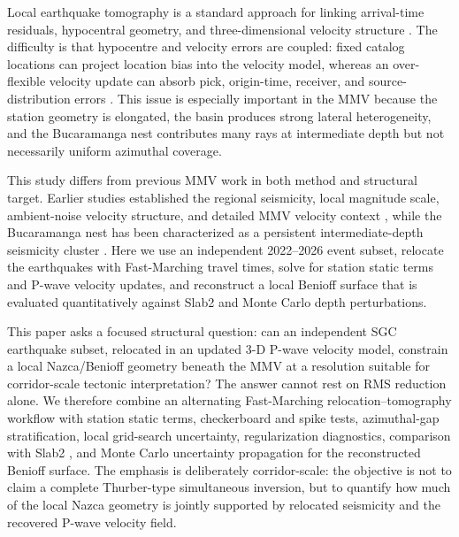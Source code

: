 \documentclass[review,authoryear]{elsarticle}
\begin{document}
Local earthquake tomography is a standard approach for linking arrival-time residuals, hypocentral geometry, and three-dimensional velocity structure \citep{Aki1976,Crosson1976,Thurber1983,Pavlis1980}. The difficulty is that hypocentre and velocity errors are coupled: fixed catalog locations can project location bias into the velocity model, whereas an over-flexible velocity update can absorb pick, origin-time, receiver, and source-distribution errors \citep{Thurber1992}. This issue is especially important in the MMV because the station geometry is elongated, the basin produces strong lateral heterogeneity, and the Bucaramanga nest contributes many rays at intermediate depth but not necessarily uniform azimuthal coverage.

This study differs from previous MMV work in both method and structural target. Earlier studies established the regional seismicity, local magnitude scale, ambient-noise velocity structure, and detailed MMV velocity context \citep{Londono2019,LondonoRomero2017,Poveda2018,Londono2020Velocity}, while the Bucaramanga nest has been characterized as a persistent intermediate-depth seismicity cluster \citep{Zarifi2007,SepulvedaJaimes2018}. Here we use an independent 2022--2026 event subset, relocate the earthquakes with Fast-Marching travel times, solve for station static terms and P-wave velocity updates, and reconstruct a local Benioff surface that is evaluated quantitatively against Slab2 and Monte Carlo depth perturbations.

This paper asks a focused structural question: can an independent SGC earthquake subset, relocated in an updated 3-D P-wave velocity model, constrain a local Nazca/Benioff geometry beneath the MMV at a resolution suitable for corridor-scale tectonic interpretation? The answer cannot rest on RMS reduction alone. We therefore combine an alternating Fast-Marching relocation--tomography workflow with station static terms, checkerboard and spike tests, azimuthal-gap stratification, local grid-search uncertainty, regularization diagnostics, comparison with Slab2 \citep{Hayes2018Slab2}, and Monte Carlo uncertainty propagation for the reconstructed Benioff surface. The emphasis is deliberately corridor-scale: the objective is not to claim a complete Thurber-type simultaneous inversion, but to quantify how much of the local Nazca geometry is jointly supported by relocated seismicity and the recovered P-wave velocity field.
\end{document}

